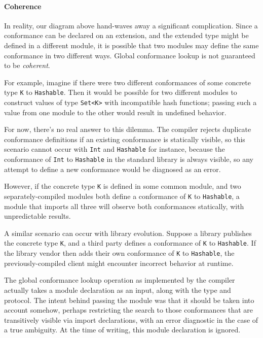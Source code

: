 \documentclass[a4paper,headsepline,bibliography=totoc,toc=flat,fleqn,twoside=semi]{scrbook}
\theoremstyle{definition}
\theoremstyle{definition}
\theoremstyle{definition}
\begin{document}
\paragraph{Coherence} In reality, our diagram above hand-waves away a significant complication. Since a conformance can be declared on an extension, and the extended type might be defined in a different module, it is possible that two modules may define the same conformance in two different ways. Global conformance lookup is not guaranteed to be \emph{coherent}.

For example, imagine if there were two different conformances of some concrete type \texttt{K} to \texttt{Hashable}. Then it would be possible for two different modules to construct values of type \texttt{Set<K>} with incompatible hash functions; passing such a value from one module to the other would result in undefined behavior.

For now, there's no real answer to this dilemma. The compiler rejects duplicate conformance definitions if an existing conformance is statically visible, so this scenario cannot occur with \texttt{Int} and \texttt{Hashable} for instance, because the conformance of \texttt{Int} to \texttt{Hashable} in the standard library is always visible, so any attempt to define a new conformance would be diagnosed as an error.

However, if the concrete type \texttt{K} is defined in some common module, and two separately-compiled modules both define a conformance of \texttt{K} to \texttt{Hashable}, a module that imports all three will observe both conformances statically, with unpredictable results.

A similar scenario can occur with library evolution. Suppose a library publishes the concrete type \texttt{K}, and a third party defines a conformance of \texttt{K} to \texttt{Hashable}. If the library vendor then adds their own conformance of \texttt{K} to \texttt{Hashable}, the previously-compiled client might encounter incorrect behavior at runtime.

The global conformance lookup operation as implemented by the compiler actually takes a module declaration as an input, along with the type and protocol. The intent behind passing the module was that it should be taken into account somehow, perhaps restricting the search to those conformances that are transitively visible via import declarations, with an error diagnostic in the case of a true ambiguity. At the time of writing, this module declaration is ignored.
\end{document}

